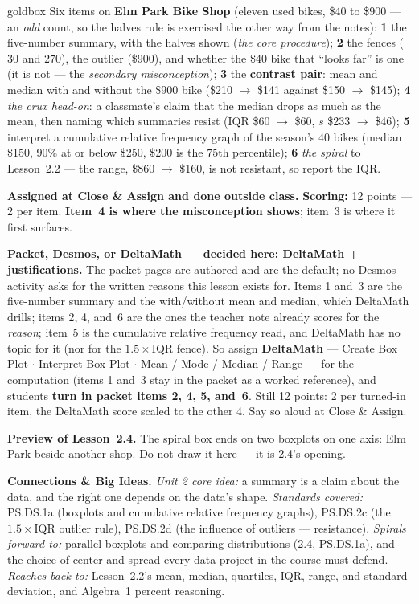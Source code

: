 \documentclass[10pt]{article}
\begin{document}
\boxguard
\begin{skillbox}{goldbox}
Six items on \textbf{Elm Park Bike Shop} (eleven used bikes, \$40 to \$900 --- an \emph{odd}
count, so the halves rule is exercised the other way from the notes): \textbf{1} the
five-number summary, with the halves shown (\emph{the core procedure}); \textbf{2} the fences
($30$ and $270$), the outlier (\$900), and whether the \$40 bike that ``looks far'' is one (it
is not --- the \emph{secondary misconception}); \textbf{3} the \textbf{contrast pair}: mean and
median with and without the \$900 bike (\$210 $\to$ \$141 against \$150 $\to$ \$145);
\textbf{4} \emph{the crux head-on}: a classmate's claim that the median drops as much as the
mean, then naming which summaries resist (IQR \$60 $\to$ \$60, $s$ \$233 $\to$ \$46);
\textbf{5} interpret a cumulative relative frequency graph of the season's $40$ bikes (median
\$150, $90\%$ at or below \$250, \$200 is the $75$th percentile); \textbf{6} \emph{the spiral}
to Lesson~2.2 --- the range, \$860 $\to$ \$160, is not resistant, so report the IQR.

\textbf{Assigned at Close \& Assign and done outside class.} \textbf{Scoring:} 12 points ---
2 per item. \textbf{Item~4 is where the misconception shows}; item~3 is where it first surfaces.

\textbf{Packet, Desmos, or DeltaMath --- decided here: DeltaMath + justifications.} The packet
pages are authored and are the default; no Desmos activity asks for the written reasons this
lesson exists for. Items 1 and~3 are the five-number summary and the with/without mean and
median, which DeltaMath drills; items 2, 4, and~6 are the ones the teacher note already scores
for the \emph{reason}; item~5 is the cumulative relative frequency read, and DeltaMath has no
topic for it (nor for the $1.5 \times \text{IQR}$ fence). So assign \textbf{DeltaMath} ---
Create Box Plot $\cdot$ Interpret Box Plot $\cdot$ Mean / Mode / Median / Range --- for the
computation (items 1 and~3 stay in the packet as a worked reference), and students \textbf{turn
in packet items 2, 4, 5, and~6}. Still 12 points: 2 per turned-in item, the DeltaMath score
scaled to the other 4. Say so aloud at Close \& Assign.

\textbf{Preview of Lesson~2.4.} The spiral box ends on two boxplots on one axis: Elm Park beside
another shop. Do not draw it here --- it is 2.4's opening.

\textbf{Connections \& Big Ideas.} \textit{Unit 2 core idea:} a summary is a claim about the
data, and the right one depends on the data's shape. \textit{Standards covered:} PS.DS.1a
(boxplots and cumulative relative frequency graphs), PS.DS.2c (the $1.5 \times \text{IQR}$
outlier rule), PS.DS.2d (the influence of outliers --- resistance). \textit{Spirals forward
to:} parallel boxplots and comparing distributions (2.4, PS.DS.1a), and the choice of center
and spread every data project in the course must defend. \textit{Reaches back to:} Lesson~2.2's
mean, median, quartiles, IQR, range, and standard deviation, and Algebra~1 percent reasoning.
\end{skillbox}
\end{document}
